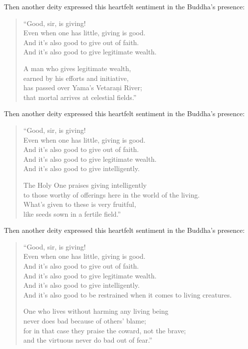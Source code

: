 \documentclass[12pt,openany]{book}%
\begin{document}
Then another deity expressed this heartfelt sentiment in the Buddha’s presence: 

\begin{verse}%
“Good, sir, is giving! \\
Even when one has little, giving is good. \\
And it’s also good to give out of faith. \\
And it’s also good to give legitimate wealth. 

A man who gives legitimate wealth, \\
earned by his efforts and initiative, \\
has passed over Yama’s \textsanskrit{Vetaraṇi} River; \\
that mortal arrives at celestial fields.” 

%
\end{verse}

Then another deity expressed this heartfelt sentiment in the Buddha’s presence: 

\begin{verse}%
“Good, sir, is giving! \\
Even when one has little, giving is good. \\
And it’s also good to give out of faith. \\
And it’s also good to give legitimate wealth. \\
And it’s also good to give intelligently. 

The Holy One praises giving intelligently \\
to those worthy of offerings here in the world of the living. \\
What’s given to these is very fruitful, \\
like seeds sown in a fertile field.” 

%
\end{verse}

Then another deity expressed this heartfelt sentiment in the Buddha’s presence: 

\begin{verse}%
“Good, sir, is giving! \\
Even when one has little, giving is good. \\
And it’s also good to give out of faith. \\
And it’s also good to give legitimate wealth. \\
And it’s also good to give intelligently. \\
And it’s also good to be restrained when it comes to living creatures. 

One who lives without harming any living being \\
never does bad because of others’ blame; \\
for in that case they praise the coward, not the brave; \\
and the virtuous never do bad out of fear.” 

%
\end{verse}
\end{document}
